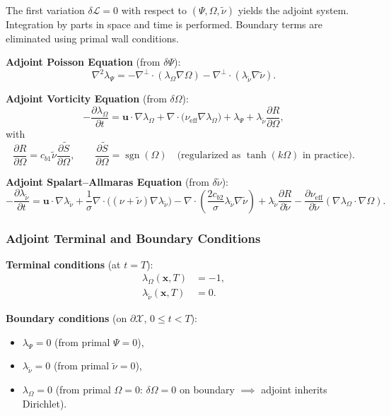 The first variation $\delta \mathcal{L} = 0$ with respect to $(\Psi, \Omega, \tilde{\nu})$ yields the adjoint system. Integration by parts in space and time is performed. Boundary terms are eliminated using primal wall conditions.

\textbf{Adjoint Poisson Equation} (from $\delta \Psi$):
\begin{equation}
\nabla^2 \lambda_{\Psi}
= -\nabla^\perp \cdot (\lambda_{\Omega} \nabla \Omega)
  -\nabla^\perp \cdot (\lambda_{\tilde{\nu}} \nabla \tilde{\nu}).
\end{equation}

\textbf{Adjoint Vorticity Equation} (from $\delta \Omega$):
\begin{equation}
-\frac{\partial \lambda_{\Omega}}{\partial t}
= \mathbf{u} \cdot \nabla \lambda_{\Omega}
  + \nabla \cdot \bigl( \nu_{\text{eff}} \nabla \lambda_{\Omega} \bigr)
  + \lambda_{\Psi}
  + \lambda_{\tilde{\nu}} \frac{\partial R}{\partial \Omega},
\end{equation}
with
\[
\frac{\partial R}{\partial \Omega}
= c_{b1} \tilde{\nu} \frac{\partial \tilde{S}}{\partial \Omega},
\qquad
\frac{\partial \tilde{S}}{\partial \Omega}
= \operatorname{sgn}(\Omega)
\quad \text{(regularized as $\tanh(k \Omega)$ in practice)}.
\]

\textbf{Adjoint Spalart--Allmaras Equation} (from $\delta \tilde{\nu}$):
\begin{equation}
-\frac{\partial \lambda_{\tilde{\nu}}}{\partial t}
= \mathbf{u} \cdot \nabla \lambda_{\tilde{\nu}}
  + \frac{1}{\sigma} \nabla \cdot \bigl( (\nu + \tilde{\nu}) \nabla \lambda_{\tilde{\nu}} \bigr)
  - \nabla \cdot \left( \frac{2 c_{b2}}{\sigma} \lambda_{\tilde{\nu}} \nabla \tilde{\nu} \right)
  + \lambda_{\tilde{\nu}} \frac{\partial R}{\partial \tilde{\nu}}
  - \frac{\partial \nu_{\text{eff}}}{\partial \tilde{\nu}} (\nabla \lambda_{\Omega} \cdot \nabla \Omega).
\end{equation}

\subsubsection*{Adjoint Terminal and Boundary Conditions}

\textbf{Terminal conditions} (at $t = T$):
\begin{align}
\lambda_{\Omega}(\mathbf{x}, T) &= -1, \\
\lambda_{\tilde{\nu}}(\mathbf{x}, T) &= 0.
\end{align}

\textbf{Boundary conditions} (on $\partial \mathcal{X}$, $0 \leq t < T$):
\begin{itemize}
    \item $\lambda_{\Psi} = 0$ \quad (from primal $\Psi = 0$),
    \item $\lambda_{\tilde{\nu}} = 0$ \quad (from primal $\tilde{\nu} = 0$),
    \item $\lambda_{\Omega} = 0$ \quad (from primal $\Omega = 0$: $\delta \Omega = 0$ on boundary $\implies$ adjoint inherits Dirichlet).
\end{itemize}

